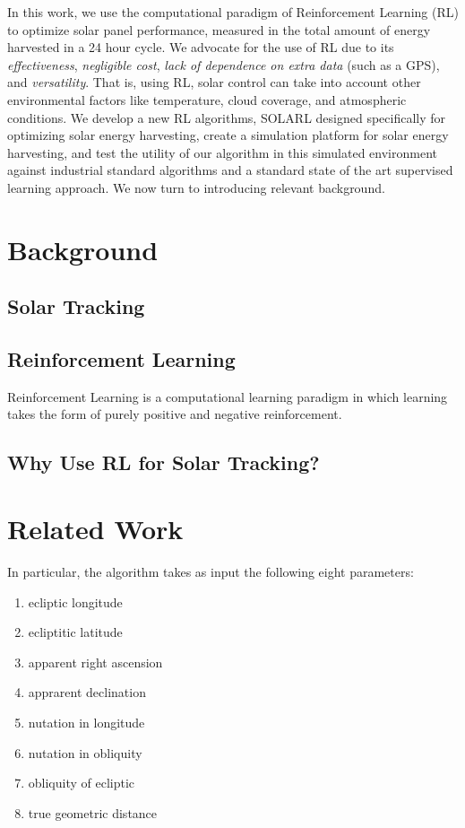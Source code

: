 \documentclass[11pt]{article}
\begin{document}
In this work, we use the computational paradigm of Reinforcement Learning (RL) to optimize solar panel performance, measured in the total amount of energy harvested in a 24 hour cycle. We advocate for the use of RL due to its {\it effectiveness}, {\it negligible cost}, {\it lack of dependence on extra data} (such as a GPS), and {\it versatility}. That is, using RL, solar control can take into account other environmental factors like temperature, cloud coverage, and atmospheric conditions. We develop a new RL algorithms, \textsc{SOLARL} designed specifically for optimizing solar energy harvesting, create a simulation platform for solar energy harvesting, and test the utility of our algorithm in this simulated environment against industrial standard algorithms and a standard state of the art supervised learning approach. We now turn to introducing relevant background.


\section{Background}



\subsection{Solar Tracking}





\subsection{Reinforcement Learning}

Reinforcement Learning is a computational learning paradigm in which learning takes the form of purely positive and negative reinforcement.


\subsection{Why Use RL for Solar Tracking?}


\section{Related Work}



In particular, the algorithm takes as input the following eight parameters:
\begin{enumerate}
\item ecliptic longitude
\item ecliptitic latitude
\item apparent right ascension
\item apprarent declination
\item nutation in longitude
\item nutation in obliquity
\item obliquity of ecliptic
\item true geometric distance
\end{enumerate}
\end{document}
